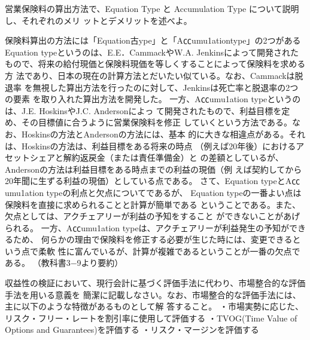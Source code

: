 \documentclass[report,gutter=10mm,fore-edge=10mm,uplatex,dvipdfmx]{jlreq}
\begin{document}
営業保険料の算出方法で、Equation Type と Accumulation Type について説明し、それぞれのメリ
ットとデメリットを述べよ。

保険料算出の方法には「Equation古ype」と「A㏄umu1ationtype」の2つがある
Equation typeというのは、E.E．CammackやW.A. Jenkinsによって開発された
もので、将来の給付現価と保険料現価を等しくすることによって保険料を求める方
法であり、日本の現在の計算方法とだいたい似ている。なお、Cammackは脱退率
を無視した算出方法を行ったのに対して、Jenkinsは死亡率と脱退率の2つの要素
を取り入れた算出方法を開発した。
一方、A㏄umu1ation typeというのは、J.E. HoskinsやJ.C. Andersonによっ
て開発されたもので、利益目標を定め、その目標値に合うように営業保険料を修正
していくという方法である。なお、Hoskinsの方法とAndersonの方法には、基本
的に大きな相違点がある。それは、Hoskinsの方法は、利益目標をある将来の時点
（例えば20年後）におけるアセットシェアと解約返戻金（または責任準備金）と
の差額としているが、Andersonの方法は利益目標をある時点までの利益の現価（例
えば契約してから20年聞に生ずる利益の現価）としている点である。
さて、Equation typeとA㏄umu1ation typeの利点と欠点についてであるが、
Equation typeの一番よい点は保険料を直接に求められることと計算が簡単である
ということである。また、欠点としては、アクチェアリーが利益の予知をすること
ができないことがあげられる。
一方、A㏄umu1ation typeは、アクチェアリーが利益発生の予知ができるため、
何らかの理由で保険料を修正する必要が生じた時には、変更できるという点で柔軟
性に富んでいるが、計算が複雑であるということが一番の欠点である。
（教科書3−9より要約）

収益性の検証において、現行会計に基づく評価手法に代わり、市場整合的な評価手法を用いる意義を
簡潔に記載しなさい。なお、市場整合的な評価手法には、主に以下のような特徴があるものとして解
答すること。
・市場実勢に応じた、リスク・フリー・レートを割引率に使用して評価する
・TVOG(Time Value of Options and Guarantees)を評価する
・リスク・マージンを評価する
\end{document}
